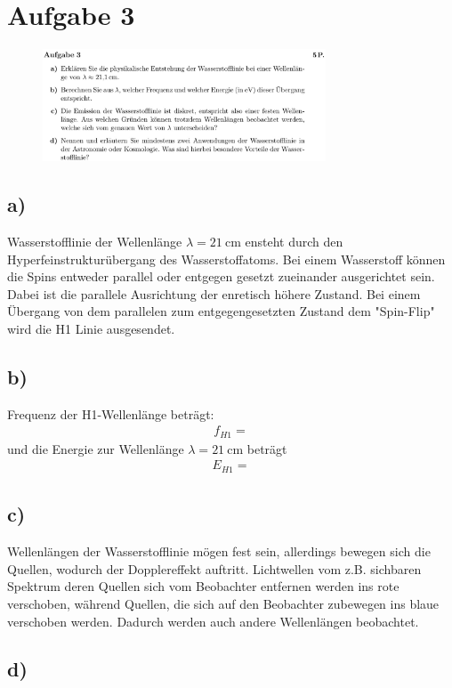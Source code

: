 \section{Aufgabe 3}

\begin{figure}[H]
    \centering
    \includegraphics[width=0.75\textwidth]{images/Aufgabe_3.jpg}
    \label{fig:3}
\end{figure}

\subsection{a)}

\justifying Wasserstofflinie der Wellenlänge $\lambda = \SI{21}{\centi\meter} $ ensteht durch den
Hyperfeinstrukturübergang des Wasserstoffatoms. Bei einem Wasserstoff können
die Spins entweder parallel oder entgegen gesetzt zueinander ausgerichtet sein.
Dabei ist die parallele Ausrichtung der enretisch höhere Zustand. Bei einem
Übergang von dem parallelen zum entgegengesetzten Zustand dem "Spin-Flip" wird
die H1 Linie ausgesendet.


\subsection{b)}

\justifying Frequenz der H1-Wellenlänge beträgt:
\begin{align*}
    f_{H1}=\text{}
\end{align*}
und die Energie zur Wellenlänge $\lambda = \SI{21}{\centi\meter} $ beträgt
\begin{align}
    E_{H1}=\text{}
\end{align}


\subsection{c)}

\justifying Wellenlängen der Wasserstofflinie mögen fest sein, allerdings bewegen sich
die Quellen, wodurch der Dopplereffekt auftritt. Lichtwellen vom z.B. sichbaren Spektrum deren Quellen sich vom
Beobachter entfernen werden ins rote verschoben, während Quellen, die sich auf den
Beobachter zubewegen ins blaue verschoben werden. Dadurch werden auch andere Wellenlängen  
beobachtet. 


\subsection{d)}



